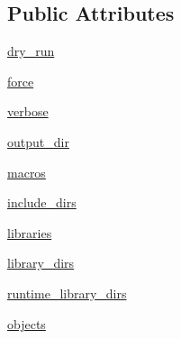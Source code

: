 \subsection*{Public Attributes}
\begin{DoxyCompactItemize}
\item 
\hyperlink{classsetuptools_1_1__distutils_1_1ccompiler_1_1CCompiler_afcfe771cc148246716dcdca91a7bc565}{dry\+\_\+run}
\item 
\hyperlink{classsetuptools_1_1__distutils_1_1ccompiler_1_1CCompiler_a76287209c0e893db1b9367272deb2aeb}{force}
\item 
\hyperlink{classsetuptools_1_1__distutils_1_1ccompiler_1_1CCompiler_a9a5e60075149b592d4dc30ee589938e5}{verbose}
\item 
\hyperlink{classsetuptools_1_1__distutils_1_1ccompiler_1_1CCompiler_a198fe320cb6d04ee5cf737d11e78a3d4}{output\+\_\+dir}
\item 
\hyperlink{classsetuptools_1_1__distutils_1_1ccompiler_1_1CCompiler_a520891adc30e9db64293bf8b54e2c4c7}{macros}
\item 
\hyperlink{classsetuptools_1_1__distutils_1_1ccompiler_1_1CCompiler_a0886798eca57d9ffa09c058a598c7465}{include\+\_\+dirs}
\item 
\hyperlink{classsetuptools_1_1__distutils_1_1ccompiler_1_1CCompiler_a5d525dbb7c7b0089ceecd9923d92c5a9}{libraries}
\item 
\hyperlink{classsetuptools_1_1__distutils_1_1ccompiler_1_1CCompiler_abcd7027cb0fdf82e357f0a75363b3ea4}{library\+\_\+dirs}
\item 
\hyperlink{classsetuptools_1_1__distutils_1_1ccompiler_1_1CCompiler_ac2fb5ab4e3fa3798f21c05c4aeea8508}{runtime\+\_\+library\+\_\+dirs}
\item 
\hyperlink{classsetuptools_1_1__distutils_1_1ccompiler_1_1CCompiler_a05be10db9784635e8180cb8b97ec2e24}{objects}
\end{DoxyCompactItemize}
